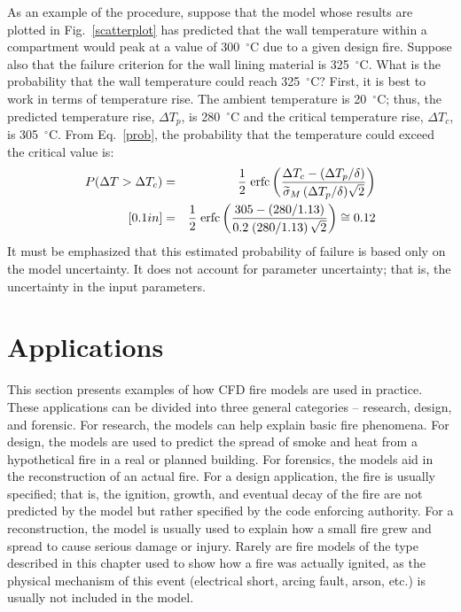 \documentclass[graybox]{svmult}
\begin{document}
As an example of the procedure, suppose that the model whose results are plotted in Fig.~\ref{scatterplot} has predicted that the wall temperature within a compartment would peak at a value of 300~$^\circ$C due to a given design fire. Suppose also that the failure criterion for the wall lining material is 325~$^\circ$C. What is the probability that the wall temperature could reach 325~$^\circ$C? First, it is best to work in terms of temperature rise. The ambient temperature is 20~$^\circ$C; thus, the predicted temperature rise, $\Delta T_p$, is 280~$^\circ$C and the critical temperature rise, $\Delta T_c$, is 305~$^\circ$C. From Eq.~\ref{prob}, the probability that the temperature could exceed the critical value is:
\begin{eqnarray}
   P(\Delta T>\Delta T_c) &=& \frac{1}{2} \; \hbox{erfc} \left( \frac{\Delta T_c-(\Delta T_p/\delta)}{\widetilde{\sigma}_M \, (\Delta T_p/\delta) \sqrt{2}} \right) \\ [0.1in]
    &=& \frac{1}{2} \; \hbox{erfc} \left( \frac{305-(280/1.13)}{0.2 \; (280/1.13) \, \sqrt{2}} \right) \cong 0.12
\end{eqnarray}
It must be emphasized that this estimated probability of failure is based only on the model uncertainty. It does not account for parameter uncertainty; that is, the uncertainty in the input parameters.



\section{Applications}

This section presents examples of how CFD fire models are used in practice. These applications can be divided into three general categories -- research, design, and forensic. For research, the models can help explain basic fire phenomena. For design, the models are used to predict the spread of smoke and heat from a hypothetical fire in a real or planned building. For forensics, the models aid in the reconstruction of an actual fire. For a design application, the fire is usually specified; that is, the ignition, growth, and eventual decay of the fire are not predicted by the model but rather specified by the code enforcing authority. For a reconstruction, the model is usually used to explain how a small fire grew and spread to cause serious damage or injury. Rarely are fire models of the type described in this chapter used to show how a fire was actually ignited, as the physical mechanism of this event (electrical short, arcing fault, arson, etc.) is usually not included in the model.
\end{document}
